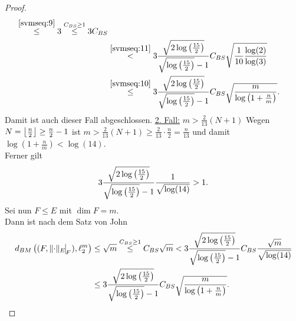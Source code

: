 \begin{proof}
\begin{align*}
\overset{\eqref{svmseq:9}}\le 3
\overset{C_{BS}\ge 1}\le 3C_{BS}\\
&\overset{\eqref{svmseq:11}}< 3\frac{\sqrt{2 \log\left(\frac {15}2 \right)}}
{\sqrt{\log\left(\frac {15}2 \right)} - 1}
C_{BS}\sqrt{\frac 1 {10}\frac{\log(2)}{\log(3)}}\\
&\overset{\eqref{svmseq:10}}\le
3\frac{\sqrt{2 \log\left(\frac {15}2 \right)}}
{\sqrt{\log\left(\frac {15}2 \right)} - 1}
C_{BS}\sqrt{\frac m{\log\left(1+\frac n m \right)}}\text.
\end{align*}
Damit ist auch dieser Fall abgeschlossen.\absatz
\underline{2. Fall:} $m > \frac 2 {13}(N+1)$\absatz
Wegen $N = \left\lfloor{\frac n 2}\right\rfloor \ge \frac n 2 - 1$ ist 
$m > \frac 2 {13}(N+1)\ge \frac 2 {13}\cdot\frac n 2 = \frac n {13}$ und
damit $\log\left(1+\frac n m \right)< \log(14)$.\\
Ferner gilt
\[3\frac{\sqrt{2 \log\left(\frac {15}2 \right)}}
{\sqrt{\log\left(\frac {15}2 \right)} - 1} \frac 1 {\sqrt{\log(14)}}> 1\text.\]
Sei nun $F \le E$ mit $\dim F = m$.\\
Dann ist nach dem Satz von John
\begin{align*}
d_{BM}\left((F, \restrict{\norm\cdot_E}F), \ell_2^m \right)
&\le \sqrt m \overset{C_{BS}\ge 1}\le C_{BS}\sqrt{m}
< 3\frac{\sqrt{2 \log\left(\frac {15}2 \right)}}
{\sqrt{\log\left(\frac{15}2 \right)}-1}C_{BS}\frac{\sqrt m}{\sqrt{\log(14)}}\\
& \le  3\frac{\sqrt{2 \log\left(\frac {15}2 \right)}}
{\sqrt{\log\left(\frac {15}2 \right)} - 1}
C_{BS}\sqrt{\frac m{\log\left(1+\frac n m \right)}}\text.
\end{align*}
\end{proof}